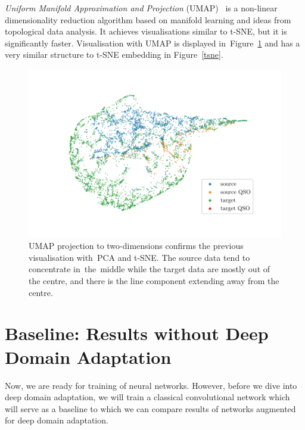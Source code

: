 \textit{Uniform Manifold Approximation and Projection} (UMAP)~\cite{mcinnes2018}
is a non-linear dimensionality reduction algorithm based on manifold learning and ideas from topological data analysis.
It achieves visualisations similar to t-SNE, but it is significantly faster.
Visualisation with UMAP is displayed in~Figure~\ref{umap}
and has a very similar structure to t-SNE embedding in Figure~\ref{tsne}.

\begin{figure}
\includegraphics[width=\textwidth]{img/umap.pdf}
\caption[UMAP visualisation of source and target data distributions]{
	UMAP projection to two-dimensions confirms the previous visualisation
	with~PCA and t-SNE.
	The source data tend to concentrate in~the~middle
	while the target data are mostly out of the centre,
	and there is the line component extending away from the centre.
	}
\label{umap}
\end{figure}

\section{Baseline: Results without Deep Domain Adaptation}
\label{baseline}

Now, we are ready for training of neural networks.
However, before we dive into deep domain adaptation,
we will train a classical convolutional network
which will serve as a baseline to which we can compare results of networks augmented for deep domain adaptation.

